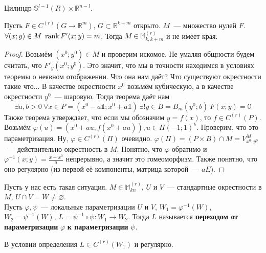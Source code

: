 \documentclass{article}
\let\tmp\varphi
\let\varphi\phi
\let\phi\tmp
\begin{document}
    \begin{example}
        Цилиндр $\mathbb S^{l-1}(R)\times\mathbb R^{n-l}$.
    \end{example}
    \begin{theorem}
        \label{Задание многообразия системой уравнений}
        Пусть $F\in C^{(r)}(G\to\mathbb R^m)$, $G\subset\mathbb R^{k+m}$ открыто. $M$~--- множество нулей $F$. $\forall(x;y)\in M~\operatorname{rank} F'(x;y)=m$. Тогда $M\in\mathbb M^{(r)}_{k,k+m}$ и не имеет края.
    \end{theorem}
    \begin{proof}
        Возьмём $(x^0;y^0)\in M$ и проверим искомое. Не умаляя общности будем считать, что $F'_y(x^0;y^0)$. Это значит, что мы в точности находимся в условиях теоремы о неявном отображении. Что она нам даёт? Что существуют окрестности такие что... В качестве окрестности $x^0$ возьмём кубическую, а в качестве окрестности $y^0$~--- шаровую. Тогда теорема даёт нам
        $$
        \exists a,b>0~\forall x\in P=(x^0-a\mathbb1;x^0+a\mathbb1)~\exists!y\in B=B_m(y^0;b)~F(x;y)=\mathbb0
        $$
        Также теорема утверждает, что если мы обозначим $y=f(x)$, то $f\in C^{(r)}(P)$. Возьмём $\phi(u)=(x^0+au;f(x^0+au)),u\in\Pi(-1;1)^k$. Проверим, что это параметризация. Ну, $\phi\in C^{(r)}(\Pi)$ очевидно. $\phi(\Pi)=(P\times B)\cap M=V_{x^0;y^0}^M$~--- действительно окрестность в $M$. Понятно, что $\phi$ обратимо и $\phi^{-1}(x;y)=\frac{x-x^0}a$ непрерывно, а значит это гомеоморфизм. Также понятно, что оно регулярно (из первой её компоненты, матрица которой~--- $aE$).
    \end{proof}
    \begin{definition}
        Пусть у нас есть такая ситуация. $M\in\mathbb M_{kn}^{(r)}$, $U$ и $V$~--- стандартные окрестности в $M$, $U\cap V=W\neq\varnothing$.\\
        Пусть $\phi,\psi$~--- локальные параметризации $U$ и $V$, $W_1=\phi^{-1}(W)$, $W_2=\psi^{-1}(W)$, $L=\psi^{-1}\circ\psi\colon W_1\to W_2$. Тогда $L$ называется \textbf{переходом от параметризации} $\phi$ \textbf{к параметризации} $\psi$.
    \end{definition}
    \begin{theorem}
        \label{Регулярность перехода}
        В условии определения $L\in C^{(r)}(W_1)$ и регулярно.
    \end{theorem}
\end{document}
